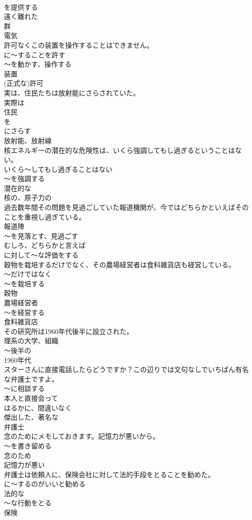 \documentclass[8pt]{extreport}
\begin{document}
\begin{CJK}{UTF8}{min}
\\	を提供する 
\\	遠く離れた 
\\	群 
\\	電気
\\	許可なくこの装置を操作することはできません。	
\\	に～することを許す 
\\	～を動かす、操作する 
\\	装置 
\\	(正式な)許可
\\	実は、住民たちは放射能にさらされていた。	
\\	実際は 
\\	住民 
\\	を
\\	にさらす 
\\	放射能、放射線
\\	核エネルギーの潜在的な危険性は、いくら強調してもし過ぎるということはない。	
\\	いくら～してもし過ぎることはない 
\\	～を強調する 
\\	潜在的な 
\\	核の、原子力の
\\	過去数年間その問題を見過ごしていた報道機関が、今ではどちらかといえばそのことを重視し過ぎている。	
\\	報道陣 
\\	～を見落とす、見過ごす 
\\	むしろ、どちらかと言えば 
\\	に対して～な評価をする
\\	穀物を栽培するだけでなく、その農場経営者は食料雑貨店も経営している。	
\\	～だけではなく 
\\	～を栽培する 
\\	穀物 
\\	農場経営者 
\\	～を経営する 
\\	食料雑貨店
\\	その研究所は1960年代後半に設立された。	
\\	理系の大学、組織 
\\	～後半の 
\\	1960年代
\\	スターさんに直接電話したらどうですか？この辺りでは文句なしでいちばん有名な弁護士ですよ。	
\\	～に相談する 
\\	本人と直接会って 
\\	はるかに、間違いなく 
\\	傑出した、著名な 
\\	弁護士
\\	念のためにメモしておきます。記憶力が悪いから。	
\\	～を書き留める 
\\	念のため 
\\	記憶力が悪い
\\	弁護士は依頼人に、保険会社に対して法的手段をとることを勧めた。	
\\	に～するのがいいと勧める 
\\	法的な 
\\	～な行動をとる 
\\	保険
\end{CJK}
\end{document}
